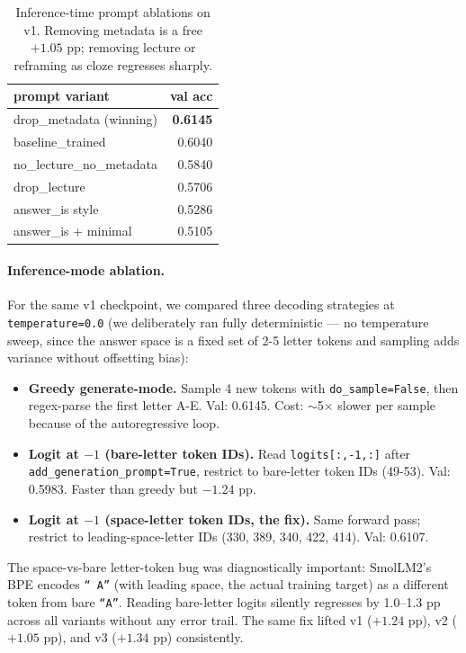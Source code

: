 \documentclass[11pt]{article}
\begin{document}
\begin{table}[h]
\centering
\small
\begin{tabular}{lr}
\toprule
prompt variant & val acc \\
\midrule
drop\_metadata (winning) & \textbf{0.6145} \\
baseline\_trained        & 0.6040 \\
no\_lecture\_no\_metadata & 0.5840 \\
drop\_lecture            & 0.5706 \\
answer\_is style          & 0.5286 \\
answer\_is + minimal      & 0.5105 \\
\bottomrule
\end{tabular}
\caption{Inference-time prompt ablations on v1. Removing metadata is a free $+1.05$ pp; removing lecture or reframing as cloze regresses sharply.}
\label{tab:prompts}
\end{table}

\paragraph{Inference-mode ablation.} For the same v1 checkpoint, we compared three decoding strategies at \texttt{temperature=0.0} (we deliberately ran fully deterministic --- no temperature sweep, since the answer space is a fixed set of 2-5 letter tokens and sampling adds variance without offsetting bias):

\begin{itemize}
    \item \textbf{Greedy generate-mode.} Sample 4 new tokens with \texttt{do\_sample=False}, then regex-parse the first letter A-E. Val: 0.6145. Cost: $\sim$5$\times$ slower per sample because of the autoregressive loop.
    \item \textbf{Logit at $-1$ (bare-letter token IDs).} Read \texttt{logits[:,-1,:]} after \texttt{add\_generation\_prompt=True}, restrict to bare-letter token IDs (49-53). Val: 0.5983. Faster than greedy but $-1.24$ pp.
    \item \textbf{Logit at $-1$ (space-letter token IDs, the fix).} Same forward pass; restrict to leading-space-letter IDs (330, 389, 340, 422, 414). Val: 0.6107.
\end{itemize}

The space-vs-bare letter-token bug was diagnostically important: SmolLM2's BPE encodes \texttt{`` A''} (with leading space, the actual training target) as a different token from bare \texttt{``A''}. Reading bare-letter logits silently regresses by 1.0--1.3 pp across all variants without any error trail. The same fix lifted v1 ($+1.24$ pp), v2 ($+1.05$ pp), and v3 ($+1.34$ pp) consistently.
\end{document}
